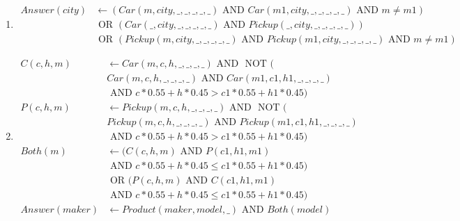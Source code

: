 \documentclass[12pt,letterpaper]{article}
\newcommand{\AND}[0]{\text{ AND }}
\newcommand{\OR}[0]{\text{ OR }}
\newcommand{\NOT}[0]{\text{ NOT }}
\begin{document}
\begin{enumerate}
\begin{enumerate}
        \item
          \begin{align*}
            Answer(city) &\leftarrow (Car(m, city, \_, \_, \_, \_, \_) \AND Car(m1, city, \_, \_, \_, \_, \_) \AND m \ne m1) \\
            &\OR (Car(\_, city, \_, \_, \_, \_, \_) \AND Pickup(\_, city, \_, \_, \_, \_, \_)) \\
            &\OR (Pickup(m, city, \_, \_, \_, \_, \_) \AND Pickup(m1, city, \_, \_, \_, \_, \_) \AND m \ne m1)
          \end{align*}

        \item
          \begin{align*}
            C(c, h, m) &\leftarrow Car(m, c, h, \_, \_, \_, \_) \AND \NOT ( \\
            &Car(m, c, h, \_, \_, \_, \_) \AND Car(m1, c1, h1, \_, \_, \_, \_) \\
            &\AND c * 0.55 + h * 0.45 > c1 * 0.55 + h1 * 0.45) \\
            P(c, h, m) &\leftarrow Pickup(m, c, h, \_, \_, \_, \_) \AND \NOT ( \\
            &Pickup(m, c, h, \_, \_, \_, \_) \AND Pickup(m1, c1, h1, \_, \_, \_, \_) \\
            &\AND c * 0.55 + h * 0.45 > c1 * 0.55 + h1 * 0.45) \\
            Both(m) &\leftarrow (C(c, h, m) \AND P(c1, h1, m1) \\
            &\AND c * 0.55 + h * 0.45 \le c1 * 0.55 + h1 * 0.45) \\
            &\OR (P(c, h, m) \AND C(c1, h1, m1) \\
            &\AND c * 0.55 + h * 0.45 \le c1 * 0.55 + h1 * 0.45) \\
            Answer(maker) &\leftarrow Product(maker, model, \_) \AND Both(model)
          \end{align*}
      \end{enumerate}


\end{enumerate}
\end{document}
